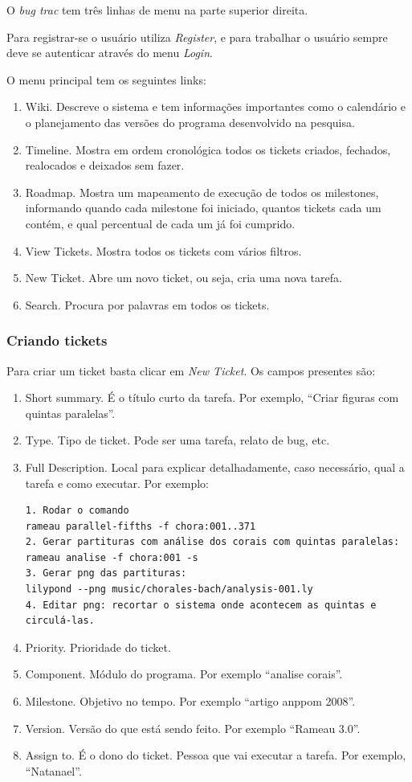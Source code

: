 \documentclass[12pt,brazil]{book}
\newcommand{\eng}[1]{\textit{#1}}
\begin{document}
O \eng{bug trac} tem três linhas de menu na parte superior direita.

Para registrar-se o usuário utiliza \eng{Register}, e para trabalhar o
usuário sempre deve se autenticar através do menu \eng{Login}.

O menu principal tem os seguintes links:

\begin{enumerate}
\item Wiki. Descreve o sistema e tem informações importantes como o
  calendário e o planejamento das versões do programa desenvolvido na
  pesquisa.
\item Timeline. Mostra em ordem cronológica todos os tickets criados,
  fechados, realocados e deixados sem fazer.
\item Roadmap. Mostra um mapeamento de execução de todos os
  milestones, informando quando cada milestone foi iniciado, quantos
  tickets cada um contém, e qual percentual de cada um já foi
  cumprido.
\item View Tickets. Mostra todos os tickets com vários filtros.
\item New Ticket. Abre um novo ticket, ou seja, cria uma nova tarefa.
\item Search. Procura por palavras em todos os tickets.
\end{enumerate}

\subsubsection{Criando tickets}
\label{sec:criando-tickets}

Para criar um ticket basta clicar em \eng{New Ticket}. Os campos
presentes são:

\begin{enumerate}
\item Short summary. É o título curto da tarefa. Por exemplo,
  ``Criar figuras com quintas paralelas''.
\item Type. Tipo de ticket. Pode ser uma tarefa, relato de bug,
  etc.
\item Full Description. Local para explicar detalhadamente, caso
  necessário, qual a tarefa e como executar. Por exemplo:
\begin{verbatim}
1. Rodar o comando
rameau parallel-fifths -f chora:001..371
2. Gerar partituras com análise dos corais com quintas paralelas:
rameau analise -f chora:001 -s
3. Gerar png das partituras:
lilypond --png music/chorales-bach/analysis-001.ly
4. Editar png: recortar o sistema onde acontecem as quintas e circulá-las.
\end{verbatim}
\item Priority. Prioridade do ticket.
\item Component. Módulo do programa. Por exemplo ``analise corais''.
\item Milestone. Objetivo no tempo. Por exemplo ``artigo anppom
  2008''.
\item Version. Versão do que está sendo feito. Por exemplo ``Rameau
  3.0''.
\item Assign to. É o dono do ticket. Pessoa que vai executar a
  tarefa. Por exemplo, ``Natanael''.
\end{enumerate}
\end{document}
